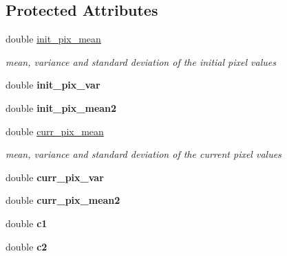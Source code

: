 \subsection*{Protected Attributes}
\begin{DoxyCompactItemize}
\item 
\hypertarget{classSSIM_af1f427b4de6bf0cb37b45b47773726cc}{double \hyperlink{classSSIM_af1f427b4de6bf0cb37b45b47773726cc}{init\-\_\-pix\-\_\-mean}}\label{classSSIM_af1f427b4de6bf0cb37b45b47773726cc}

\begin{DoxyCompactList}\small\item\em mean, variance and standard deviation of the initial pixel values \end{DoxyCompactList}\item 
\hypertarget{classSSIM_a38b0bb9a4d9484640522c0fb892e68ea}{double {\bfseries init\-\_\-pix\-\_\-var}}\label{classSSIM_a38b0bb9a4d9484640522c0fb892e68ea}

\item 
\hypertarget{classSSIM_ace86f73b8bc869805f0df3febbd82fec}{double {\bfseries init\-\_\-pix\-\_\-mean2}}\label{classSSIM_ace86f73b8bc869805f0df3febbd82fec}

\item 
\hypertarget{classSSIM_a642d8170cbb2ea7a376cb7431e735064}{double \hyperlink{classSSIM_a642d8170cbb2ea7a376cb7431e735064}{curr\-\_\-pix\-\_\-mean}}\label{classSSIM_a642d8170cbb2ea7a376cb7431e735064}

\begin{DoxyCompactList}\small\item\em mean, variance and standard deviation of the current pixel values \end{DoxyCompactList}\item 
\hypertarget{classSSIM_afe45ce0700cb7f828282c8b374f2bd9a}{double {\bfseries curr\-\_\-pix\-\_\-var}}\label{classSSIM_afe45ce0700cb7f828282c8b374f2bd9a}

\item 
\hypertarget{classSSIM_ac4e6ed19e57da8414f532b0e536aa3ad}{double {\bfseries curr\-\_\-pix\-\_\-mean2}}\label{classSSIM_ac4e6ed19e57da8414f532b0e536aa3ad}

\item 
\hypertarget{classSSIM_a7930d9fe837a440f4a350f31823b0a69}{double {\bfseries c1}}\label{classSSIM_a7930d9fe837a440f4a350f31823b0a69}

\item 
\hypertarget{classSSIM_ae672ad8a7c2d3108a81fb4e8d5de9ad5}{double {\bfseries c2}}\label{classSSIM_ae672ad8a7c2d3108a81fb4e8d5de9ad5}


\end{DoxyCompactItemize}
